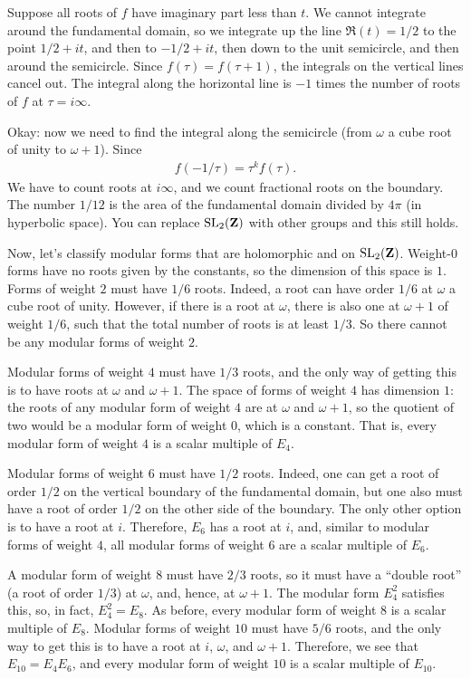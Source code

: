 \documentclass[11pt, oneside,margin=1in]{article}
\begin{document}
Suppose all roots of $f$ have imaginary part less than $t$. We cannot integrate around the fundamental domain, so we integrate up the line $\Re(t) = 1/2$ to the point $1/2 + it$, and then to $-1/2 + it$, then down to the unit semicircle, and then around the semicircle. Since $f(\tau) = f (\tau + 1)$, the integrals on the vertical lines cancel out. The integral along the horizontal line is $-1$ times the number of roots of $f$ at $\tau = i\infty$.

Okay: now we need to find the integral along the semicircle (from $\omega$ a cube root of unity to $\omega + 1$). Since 
 \begin{align*}
	f(-1/\tau) = \tau^k f (\tau).
\end{align*}
\fi
We have to count roots at $i\infty$, and we count fractional roots on the boundary. The number $1/12$ is the area of the fundamental domain divided by $4\pi$ (in hyperbolic space). You can replace $\operatorname{SL}_{2}(\mathbf Z)$ with other groups and this still holds.

Now, let's classify modular forms that are holomorphic and on $\operatorname{SL}_{2}(\mathbf Z)$. Weight-$0$ forms have no roots given by the constants, so the dimension of this space is $1$. Forms of weight $2$ must have $1/6$ roots. Indeed, a root can have order $1/6$ at $\omega$ a cube root of unity. However, if there is a root at $\omega$, there is also one at $\omega + 1$ of weight $1/6$, such that the total number of roots is at least $1/3$. So there cannot be any modular forms of weight $2$.

Modular forms of weight $4$ must have $1/3$ roots, and the only way of getting this is to have roots at $\omega$ and $\omega + 1$. The space of forms of weight $4$ has dimension $1$: the roots of any modular form of weight $4$ are at $\omega$ and $\omega + 1$, so the quotient of two would be a modular form of weight $0$, which is a constant. That is, every modular form of weight $4$ is a scalar multiple of $E_4$.

Modular forms of weight $6$ must have $1/2$ roots. Indeed, one can get a root of order $1/2$ on the vertical boundary of the fundamental domain, but one also must have a root of order $1/2$ on the other side of the boundary. The only other option is to have a root at $i$. Therefore, $E_6$ has a root at $i$, and, similar to modular forms of weight $4$, all modular forms of weight $6$ are a scalar multiple of $E_6$. 

A modular form of weight $8$ must have $2/3$ roots, so it must have a ``double root'' (a root of order $1/3$) at $\omega$, and, hence, at $\omega + 1$. The modular form $E_4^2$ satisfies this, so, in fact, $E_4^2 = E_8$. As before, every modular form of weight $8$ is a scalar multiple of $E_8$. Modular forms of weight $10$ must have $5/6$ roots, and the only way to get this is to have a root at $i$, $\omega$, and $\omega + 1$. Therefore, we see that $E_{10} = E_4E_6$, and every modular form of weight $10$ is a scalar multiple of $E_{10}$.
\end{document}
